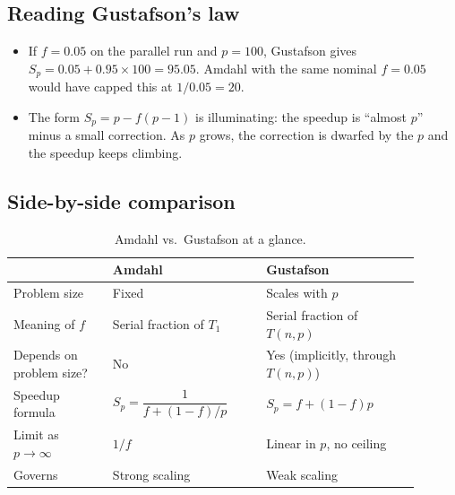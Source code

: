 \subsection{Reading Gustafson's law}

\begin{itemize}
  \item If $f = 0.05$ on the parallel run and $p = 100$, Gustafson gives
        $S_p = 0.05 + 0.95 \times 100 = 95.05$. Amdahl with the same
        nominal $f = 0.05$ would have capped this at $1/0.05 = 20$.
  \item The form $S_p = p - f(p-1)$ is illuminating: the speedup is
        ``almost $p$'' minus a small correction. As $p$ grows, the
        correction is dwarfed by the $p$ and the speedup keeps climbing.
\end{itemize}

\subsection{Side-by-side comparison}

\begin{table}[h]
\centering
\renewcommand{\arraystretch}{1.3}
\begin{tabular}{@{}p{0.22\linewidth} p{0.34\linewidth} p{0.34\linewidth}@{}}
\toprule
 & \textbf{Amdahl} & \textbf{Gustafson} \\ \midrule
Problem size & Fixed & Scales with $p$ \\
Meaning of $f$ & Serial fraction of $T_1$ & Serial fraction of $T(n,p)$ \\
Depends on problem size? & No & Yes (implicitly, through $T(n,p)$) \\
Speedup formula & $S_p = \dfrac{1}{f + (1-f)/p}$ & $S_p = f + (1-f)p$ \\
Limit as $p\to\infty$ & $1/f$ & Linear in $p$, no ceiling \\
Governs & Strong scaling & Weak scaling \\
\bottomrule
\end{tabular}
\caption{Amdahl vs.\ Gustafson at a glance.}
\label{tab:amdahl-vs-gustafson}
\end{table}

